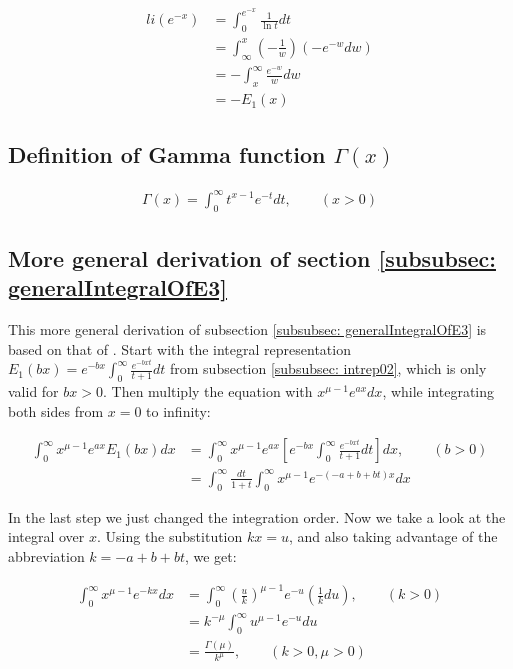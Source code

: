 \documentclass[bibliography=totocnumbered]{scrartcl}
\newcommand{\assume}[1][\text{MISSING PARAMETER}]{,\qquad\left(#1\right)}
\begin{document}
			\begin{align}
				li\left(e^{-x}\right)&=\int_{0}^{e^{-x}}\frac{1}{\ln{t}}dt\\
				&=\int_{\infty}^{x}\left(-\frac{1}{w}\right)\left(-e^{-w}dw\right)\\
				&=-\int_{x}^{\infty}\frac{e^{-w}}{w}dw\\
				&=-E_1\left(x\right)
			\end{align}

		\subsection{Definition of Gamma function $\Gamma\left(x\right)$}
		\label{appsubsec: Gamma}

			\begin{gather}
				\Gamma\left(x\right)=\int_{0}^{\infty}t^{x-1}e^{-t}dt\assume[x>0]\label{eq: Gamma}
			\end{gather}

		\subsection{More general derivation of section \ref{subsubsec: generalIntegralOfE3}}
		\label{appsec: moreGeneralDerivation1}

			This more general derivation of subsection \ref{subsubsec: generalIntegralOfE3} is based on that of \autocite[73\psq]{schloemilch}. Start with the integral representation $E_1\left(bx\right)=e^{-bx}\int_{0}^{\infty}\frac{e^{-bxt}}{t+1}dt$ from subsection \ref{subsubsec: intrep02}, which is only valid for $bx>0$. Then multiply the equation with $x^{\mu-1}e^{ax}dx$, while integrating both sides from $x=0$ to infinity:

			\begin{align}
				\int_{0}^{\infty}x^{\mu-1}e^{ax}E_1\left(bx\right)dx&=\int_{0}^{\infty}x^{\mu-1}e^{ax}\left[e^{-bx}\int_{0}^{\infty}\frac{e^{-bxt}}{t+1}dt\right]dx\assume[b>0]\\
				&=\int_{0}^{\infty}\frac{dt}{1+t}\int_{0}^{\infty}x^{\mu-1}e^{-\left(-a+b+bt\right)x}dx
			\end{align}

			In the last step we just changed the integration order. Now we take a look at the integral over $x$. Using the substitution $kx=u$, and also taking advantage of the abbreviation $k=-a+b+bt$, we get:

			\begin{align}
				\int_{0}^{\infty}x^{\mu-1}e^{-kx}dx&=\int_{0}^{\infty}\left(\frac{u}{k}\right)^{\mu-1}e^{-u}\left(\frac{1}{k}du\right)\assume[k>0]\\
				&=k^{-\mu}\int_{0}^{\infty}u^{\mu-1}e^{-u}du\\
				&=\frac{\Gamma\left(\mu\right)}{k^{\mu}}\assume[k>0, \mu>0]
			\end{align}
\end{document}
